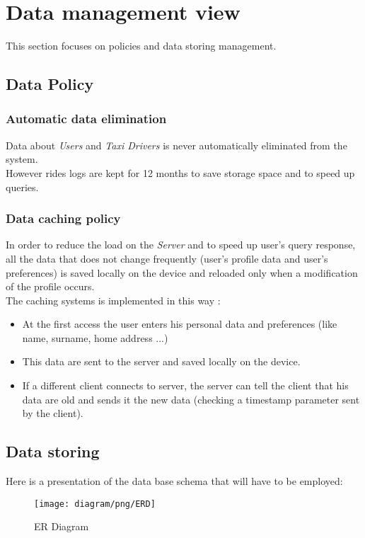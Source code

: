 \section{Data management view} %
\label{sec:data_management}
This section focuses on policies and data storing management.\\
\subsection{Data Policy} %
\label{sub:data_policy}
\subsubsection{Automatic data elimination} %
\label{ssub:data_elimination}
Data about \emph{Users} and \emph{Taxi Drivers} is never automatically eliminated from the system.\\
However rides logs are kept for 12 months to save storage space and to speed up queries.
\subsubsection{Data caching policy} %
\label{ssub:data_caching}
In order to reduce the load on the \emph{Server} and to speed up user's query response, all the data that does not change frequently (user's profile data and user's preferences) is saved locally on the device and reloaded only when a modification of the profile occurs.\\
The caching systems is implemented in this way :
\begin{itemize}
	\item At the first access the user enters his personal data and preferences (like name, surname, home address ...)
	\item This data are sent to the server and saved locally on the device.
	\item If a different client connects to server, the server can tell the client that his data are old and sends it the new data (checking a timestamp parameter sent by the client).
\end{itemize}

\subsection{Data storing} %
Here is a presentation of the data base schema that will have to be employed:
\newpage
\label{sub:data_storing}
\begin{figure}[h!t]
\caption{ER Diagram}
\texttt{[image: diagram/png/ERD]}
\centering
\end{figure}
\newpage

